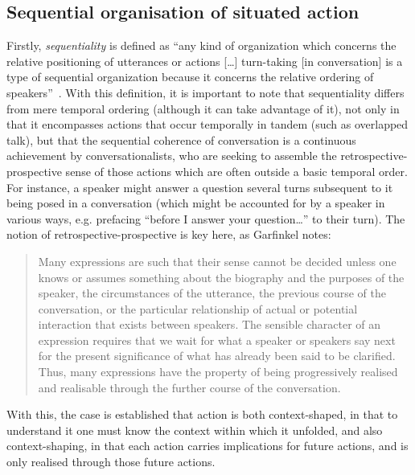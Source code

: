 


\subsection{Sequential organisation of situated action}\label{sec:background approach em sequentiality}
Firstly, \textit{sequentiality} is defined as ``any kind of organization which concerns the relative positioning of utterances or actions [\ldots] turn-taking [in conversation] is a type of sequential organization because it concerns the relative ordering of speakers''~\citep[pp. 1--3]{Schegloff2007}.
With this definition, it is important to note that sequentiality differs from mere temporal ordering (although it can take advantage of it), not only in that it encompasses actions that occur temporally in tandem (such as overlapped talk), but that the sequential coherence of conversation is a continuous achievement by conversationalists, who are seeking to assemble the retrospective-prospective sense of those actions which are often outside a basic temporal order.
For instance, a speaker might answer a question several turns subsequent to it being posed in a conversation (which might be accounted for by a speaker in various ways, e.g. prefacing ``before I answer your question\ldots'' to their turn).
The notion of retrospective-prospective is key here, as Garfinkel notes:
\begin{quote}
    Many expressions are such that their sense cannot be decided unless one knows or assumes something about the biography and the purposes of the speaker, the circumstances of the utterance, the previous course of the conversation, or the particular relationship of actual or potential interaction that exists between speakers. The sensible character of an expression requires that we wait for what a speaker or speakers say next for the present significance of what has already been said to be clarified. Thus, many expressions have the property of being progressively realised and realisable through the further course of the conversation.
\end{quote} 
With this, the case is established that action is both context-shaped, in that to understand it one must know the context within which it unfolded, and also context-shaping, in that each action carries implications for future actions, and is only realised through those future actions.
